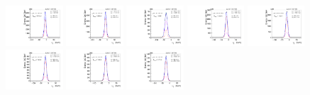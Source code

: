\begin{figure}[htb]
\includegraphics[width=0.19\textwidth]{plots/Appendix_Recoil_Fits/WmpMC_PF_5TeV_2G/pfu1fit_8.pdf}
\includegraphics[width=0.19\textwidth]{plots/Appendix_Recoil_Fits/WmpMC_PF_5TeV_2G/pfu1fit_9.pdf}
\includegraphics[width=0.19\textwidth]{plots/Appendix_Recoil_Fits/WmpMC_PF_5TeV_2G/pfu1fit_19.pdf}
\includegraphics[width=0.19\textwidth]{plots/Appendix_Recoil_Fits/WmpMC_PF_5TeV_2G/pfu1fit_11.pdf}
\includegraphics[width=0.19\textwidth]{plots/Appendix_Recoil_Fits/WmpMC_PF_5TeV_2G/pfu1fit_12.pdf}
\includegraphics[width=0.19\textwidth]{plots/Appendix_Recoil_Fits/WmpMC_PF_5TeV_2G/pfu1fit_13.pdf}
\includegraphics[width=0.19\textwidth]{plots/Appendix_Recoil_Fits/WmpMC_PF_5TeV_2G/pfu1fit_14.pdf}
\includegraphics[width=0.19\textwidth]{plots/Appendix_Recoil_Fits/WmpMC_PF_5TeV_2G/pfu1fit_15.pdf}

\end{figure}
